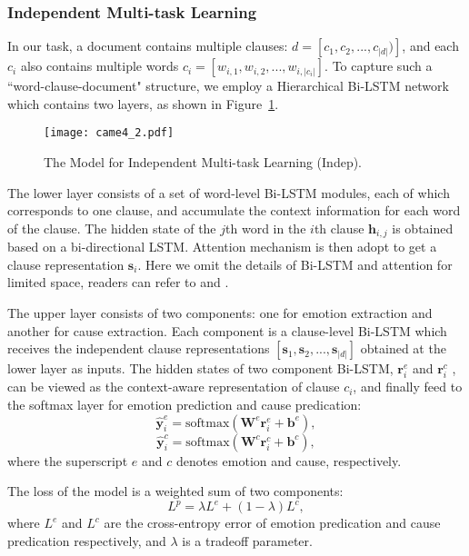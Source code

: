 \documentclass[11pt,a4paper]{article}
\begin{document}
\subsubsection{Independent Multi-task Learning}
In our task, a document contains multiple clauses: $ d=[c_1,c_2,...,c_{|d|})] $, and each $ c_i $ also contains multiple words $ c_i=[w_{i,1},w_{i,2},...,w_{i,|c_i |}] $. To capture such a ``word-clause-document" structure, we employ a Hierarchical Bi-LSTM network which contains two layers, as shown in Figure~\ref{FigureTwo}.

\begin{figure}
	\centering
	\texttt{[image: came4\_2.pdf]}
	\caption{The Model for Independent Multi-task Learning (Indep).}
	\label{FigureTwo}
\end{figure}

The lower layer consists of a set of word-level Bi-LSTM  modules, each of which corresponds to one clause, and accumulate the context information for each word of the clause. The hidden state of the $ j $th word in the $ i $th clause $ \mathbf{h}_{i,j} $ is obtained based on a bi-directional LSTM. Attention mechanism is then adopt to get a clause representation $ \mathbf{s}_i $. Here we omit the details of Bi-LSTM and attention for limited space, readers can refer to \citet{graves2013speech} and \citet{bahdanau2014neural}.

The upper layer consists of two components: one for emotion extraction and another for cause extraction. Each component is a clause-level Bi-LSTM which receives the independent clause representations $ [\mathbf{s}_1,\mathbf{s}_2,...,\mathbf{s}_{|d|} ] $ obtained at the lower layer as inputs. The hidden states of two component Bi-LSTM,  $ \mathbf{r}_i^e $ and $ \mathbf{r}_i^c $ , can be viewed as the context-aware representation of clause $ c_i $, and finally feed to the softmax layer for emotion prediction and cause predication:
\begin{equation}
\label{eqn_example}
\hat{\mathbf{y}}^e_i = \textrm{softmax}( \mathbf{W}^e\mathbf{r}_i^e + \mathbf{b}^e),
\end{equation}
\begin{equation}
\label{eqn_example}
\hat{\mathbf{y}}^c_i = \textrm{softmax}( \mathbf{W}^c\mathbf{r}_i^c + \mathbf{b}^c),
\end{equation}
where the superscript $ e $ and $ c $ denotes emotion and cause, respectively.

The loss of the model is a weighted sum of two components:
\begin{equation}\label{key}
L^p=\lambda L^e+(1-\lambda) L^c,
\end{equation}
where $ L^e $ and $ L^c $ are the cross-entropy error of emotion predication and cause predication respectively, and $ \lambda $ is a tradeoff parameter.
\end{document}
